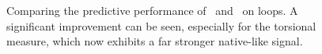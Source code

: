 \begin{figure}[p]
\begin{center}
\end{center}
\caption[Comparing the predictive performance of \prearcus\ and \arcus\ on  loops.]{Comparing the predictive performance of \prearcus\ and \arcus\ on  loops. A significant improvement can be seen, especially for the torsional measure, which now exhibits a far stronger native-like signal.}
\label{figure:arcus:compPrearcusArcus}
\end{figure}

